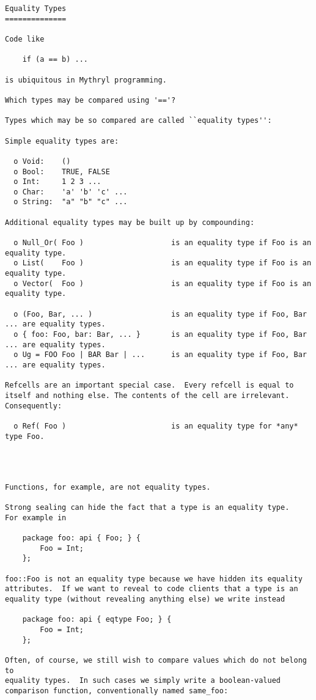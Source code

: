 \begin{verbatim}
Equality Types 
============== 

Code like 

    if (a == b) ... 

is ubiquitous in Mythryl programming. 

Which types may be compared using '=='? 

Types which may be so compared are called ``equality types'': 

Simple equality types are: 

  o Void:    () 
  o Bool:    TRUE, FALSE 
  o Int:     1 2 3 ... 
  o Char:    'a' 'b' 'c' ... 
  o String:  "a" "b" "c" ... 

Additional equality types may be built up by compounding: 

  o Null_Or( Foo )                    is an equality type if Foo is an equality type.  
  o List(    Foo )                    is an equality type if Foo is an equality type.  
  o Vector(  Foo )                    is an equality type if Foo is an equality type. 

  o (Foo, Bar, ... )                  is an equality type if Foo, Bar ... are equality types. 
  o { foo: Foo, bar: Bar, ... }       is an equality type if Foo, Bar ... are equality types. 
  o Ug = FOO Foo | BAR Bar | ...      is an equality type if Foo, Bar ... are equality types. 

Refcells are an important special case.  Every refcell is equal to 
itself and nothing else. The contents of the cell are irrelevant. 
Consequently: 

  o Ref( Foo )                        is an equality type for *any* type Foo. 




Functions, for example, are not equality types. 

Strong sealing can hide the fact that a type is an equality type. 
For example in 

    package foo: api { Foo; } { 
        Foo = Int; 
    }; 

foo::Foo is not an equality type because we have hidden its equality 
attributes.  If we want to reveal to code clients that a type is an 
equality type (without revealing anything else) we write instead 

    package foo: api { eqtype Foo; } { 
        Foo = Int; 
    }; 

Often, of course, we still wish to compare values which do not belong to 
equality types.  In such cases we simply write a boolean-valued 
comparison function, conventionally named same_foo: 


\end{verbatim}
